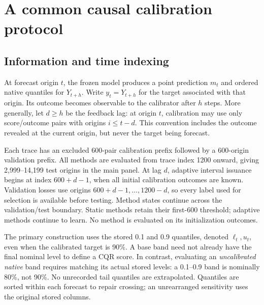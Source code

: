 \documentclass[preprint,11pt]{elsarticle}
\begin{document}
\section{A common causal calibration protocol}
\subsection{Information and time indexing}
At forecast origin $t$, the frozen model produces a point prediction $m_t$ and ordered
native quantiles for $Y_{t+h}$. Write $y_t=Y_{t+h}$ for the target associated with that
origin. Its outcome becomes observable to the calibrator after $h$ steps. More generally,
let $d\geq h$ be the feedback lag: at origin $t$, calibration may use only score/outcome
pairs with origins $i\leq t-d$. This convention includes the outcome revealed at the
current origin, but never the target being forecast.

Each trace has an excluded 600-pair calibration prefix followed by a 600-origin validation
prefix. All methods are evaluated from trace index 1200 onward, giving 2,999--14,199 test
origins in the main panel. At lag $d$, adaptive interval issuance begins at index $600+d-1$,
when all initial calibration outcomes are known. Validation losses use origins
$600+d-1,\ldots,1200-d$, so every label used for selection is available before testing.
Method states continue across the validation/test boundary. Static methods retain their
first-600 threshold; adaptive methods continue to learn. No method is evaluated on its
initialization outcomes.

The primary construction uses the stored 0.1 and 0.9 quantiles, denoted $\ell_t,u_t$,
even when the calibrated target is 90\%. A base band need not already have the final
nominal level to define a CQR score. In contrast, evaluating an \emph{uncalibrated native}
band requires matching its actual stored levels: a 0.1--0.9 band is nominally 80\%, not
90\%. No unrecorded tail quantiles are extrapolated. Quantiles are sorted within each
forecast to repair crossing; an unrearranged sensitivity uses the original stored columns.
\end{document}
